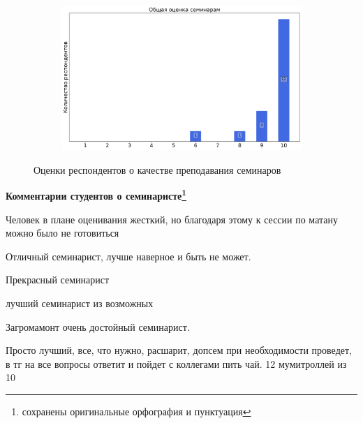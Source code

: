 \begin{figure}[H]
\begin{subfigure}[b]{0.45\textwidth}
			\end{subfigure}
			\begin{subfigure}[b]{0.45\textwidth}
				\centering
				\includegraphics[width=\textwidth]{images/1 course/Математический анализ/seminarists-marks-Загрядский О.А.-3.png}
			\end{subfigure}	
			\caption{Оценки респондентов о качестве преподавания семинаров}
		\end{figure}

		\textbf{Комментарии студентов о семинаристе\protect\footnote{сохранены оригинальные орфография и пунктуация}}
			\begin{commentbox} 
				Человек в плане оценивания жесткий, но благодаря этому к сессии по матану можно было не готовиться 
			\end{commentbox} 
		
			\begin{commentbox} 
				Отличный семинарист, лучше наверное и быть не может. 
			\end{commentbox} 
		
			\begin{commentbox} 
				Прекрасный семинарист 
			\end{commentbox} 
		
			\begin{commentbox} 
				лучший семинарист из возможных 
			\end{commentbox} 
		
			\begin{commentbox} 
				Загромамонт очень достойный семинарист.  
			\end{commentbox} 
		
			\begin{commentbox} 
				Просто лучший, все, что нужно, расшарит, допсем при необходимости проведет, в тг на все вопросы ответит и пойдет с коллегами пить чай. 12 мумитроллей из 10 
			\end{commentbox} 
		
